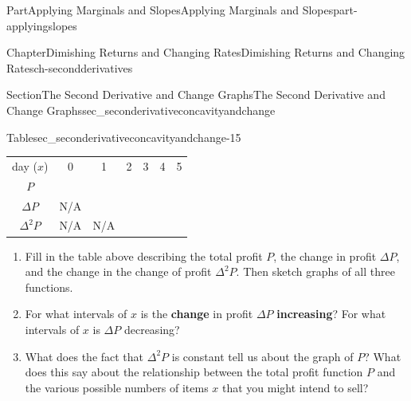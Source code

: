 \documentclass{tufte-book}
\newcommand{\tabularfont}{\relax}
\newcommand{\terminology}[1]{\textbf{#1}}
\numberwithin{equation}{chapter}
\begin{document}
\begin{partptx}{Part}{Applying Marginals and Slopes}{}{Applying Marginals and Slopes}{}{}{part-applyingslopes}
\begin{chapterptx}{Chapter}{Dimishing Returns and Changing Rates}{}{Dimishing Returns and Changing Rates}{}{}{ch-secondderivatives}
\begin{sectionptx}{Section}{The Second Derivative and Change Graphs}{}{The Second Derivative and Change Graphs}{}{}{sec_seconderivativeconcavityandchange}
\begin{image}{0}{1}{0}{}
{\begin{tikzpicture}[xscale=\xscale,yscale=\yscale]
	
\end{tikzpicture}
}%
\end{image}%
\begin{tableptx}{Table}{\textbf{}}{sec_seconderivativeconcavityandchange-15}{}%
\centering%
{\tabularfont%
\begin{tabular}{lllllll}
\multicolumn{1}{c}{day (\(x\))}&\multicolumn{1}{c}{0}&\multicolumn{1}{c}{1}&\multicolumn{1}{c}{2}&\multicolumn{1}{c}{3}&\multicolumn{1}{c}{4}&\multicolumn{1}{c}{5}\tabularnewline[0pt]
\multicolumn{1}{c}{\(P\)}&\multicolumn{1}{c}{}&\multicolumn{1}{c}{}&\multicolumn{1}{c}{}&\multicolumn{1}{c}{}&\multicolumn{1}{c}{}&\multicolumn{1}{c}{}\tabularnewline[0pt]
\multicolumn{1}{c}{\(\Delta P\)}&\multicolumn{1}{c}{N\slash{}A}&\multicolumn{1}{c}{}&\multicolumn{1}{c}{}&\multicolumn{1}{c}{}&\multicolumn{1}{c}{}&\multicolumn{1}{c}{}\tabularnewline[0pt]
\multicolumn{1}{c}{\(\Delta^2 P\)}&\multicolumn{1}{c}{N\slash{}A}&\multicolumn{1}{c}{N\slash{}A}&\multicolumn{1}{c}{}&\multicolumn{1}{c}{}&\multicolumn{1}{c}{}&\multicolumn{1}{c}{}
\end{tabular}
}%
\end{tableptx}%
%
\begin{enumerate}
\item{}Fill in the table above describing the total profit \(P\), the change in profit \(\Delta P\), and the change in the change of profit \(\Delta^2 P\). Then sketch graphs of all three functions.%
\item{}For what intervals of \(x\) is the \terminology{change} in profit \(\Delta P\) \terminology{increasing}? For what intervals of \(x\) is \(\Delta P\) decreasing?%
\item{}What does the fact that \(\Delta^2 P\) is constant tell us about the graph of \(P\)? What does this say about the relationship between the total profit function \(P\) and the various possible numbers of items \(x\) that you might intend to sell?%
\end{enumerate}
%
\end{sectionptx}
\end{chapterptx}
\end{partptx}
%
%
\typeout{************************************************}
\typeout{************************************************}
%
\end{document}
